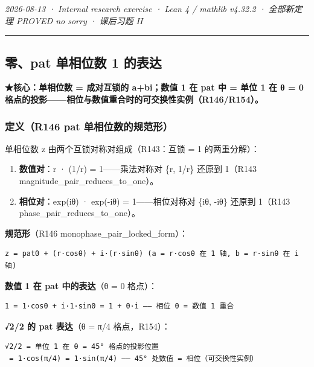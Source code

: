 \documentclass[
]{article}
\providecommand{\tightlist}{%
 \setlength{\itemsep}{0pt}\setlength{\parskip}{0pt}}
\begin{document}
\emph{2026-08-13 · Internal research exercise · Lean 4 / mathlib v4.32.2
· 全部新定理 PROVED no sorry · 课后习题 II }

\begin{center}\rule{0.5\linewidth}{0.5pt}\end{center}

\subsection{零、pat 单相位数 1
的表达}\label{ux96f6pat-ux5355ux76f8ux4f4dux6570-1-ux7684ux8868ux8fbe}

\textbf{★核心：单相位数 = 成对互锁的 a+bi；数值 1 在 pat 中 = 单位 1 在
θ = 0 格点的投影------相位与数值重合时的可交换性实例（R146/R154）。}

\subsubsection{定义（R146 pat
单相位数的规范形）}\label{ux5b9aux4e49r146-pat-ux5355ux76f8ux4f4dux6570ux7684ux89c4ux8303ux5f62}

单相位数 z 由两个互锁对称对组成（R143：互锁 = 1 的两重分解）：

\begin{enumerate}
\def\labelenumi{\arabic{enumi}.}
\tightlist
\item
 \textbf{数值对}：r · (1/r) = 1------乘法对称对 \{r, 1/r\} 还原到
 1（R143 magnitude\_pair\_reduces\_to\_one）。
\item
 \textbf{相位对}：exp(iθ) · exp(-iθ) = 1------相位对称对 \{iθ, -iθ\}
 还原到 1（R143 phase\_pair\_reduces\_to\_one）。
\end{enumerate}

\textbf{规范形}（R146 monophase\_pair\_locked\_form）：

\begin{verbatim}
z = pat0 + (r·cosθ) + i·(r·sinθ) (a = r·cosθ 在 1 轴, b = r·sinθ 在 i 轴)
\end{verbatim}

\textbf{数值 1 在 pat 中的表达}（θ = 0 格点）：

\begin{verbatim}
1 = 1·cos0 + i·1·sin0 = 1 + 0·i —— 相位 0 = 数值 1 重合
\end{verbatim}

\textbf{√2/2 的 pat 表达}（θ = π/4 格点，R154）：

\begin{verbatim}
√2/2 = 单位 1 在 θ = 45° 格点的投影位置
 = 1·cos(π/4) = 1·sin(π/4) —— 45° 处数值 = 相位（可交换性实例）
\end{verbatim}
\end{document}
